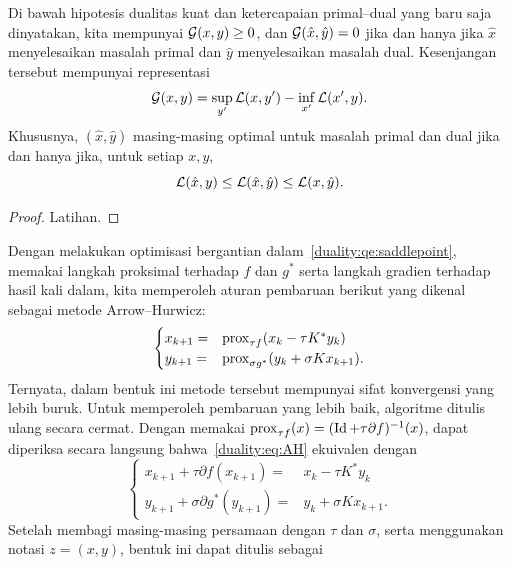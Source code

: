 \begin{lemma}
    Di bawah hipotesis dualitas kuat dan ketercapaian primal--dual yang baru saja dinyatakan, kita mempunyai $\mathcal{G}(x,y)\geq 0$, dan $\mathcal{G}(\hat x,\hat y) = 0$ jika dan hanya jika $\hat x$ menyelesaikan masalah primal dan $\hat y$ menyelesaikan masalah dual. Kesenjangan tersebut mempunyai representasi
    \begin{equation}
        \mathcal{G}(x,y) = \sup_{y'}\mathcal{L}(x,y') - \inf_{x'}\mathcal{L}(x',y).
    \end{equation}
    Khususnya, $(\hat x,\hat y)$ masing-masing optimal untuk masalah primal dan dual jika dan hanya jika, untuk setiap $x,y$,
    \begin{equation}
        \mathcal{L}(\hat x,y)\leq \mathcal{L}(\hat x,\hat y)\leq \mathcal{L}(x,\hat y).
    \end{equation}
\end{lemma}
\begin{proof}
    Latihan.
\end{proof}
Dengan melakukan optimisasi bergantian dalam~\eqref{duality:qe:saddlepoint}, memakai langkah proksimal terhadap $f$ dan $g^*$ serta langkah gradien terhadap hasil kali dalam, kita memperoleh aturan pembaruan berikut yang dikenal sebagai metode Arrow--Hurwicz:
\begin{equation}\label{duality:eq:AH}
    \begin{cases}
        x_{k+1} =& \mathrm{prox}_{\tau f}(x_k-\tau K^*y_k)\\
        y_{k+1} =& \mathrm{prox}_{\sigma g^*}(y_k+\sigma Kx_{k+1}).
    \end{cases}
\end{equation}
Ternyata, dalam bentuk ini metode tersebut mempunyai sifat konvergensi yang lebih buruk. Untuk memperoleh pembaruan yang lebih baik, algoritme ditulis ulang secara cermat. Dengan memakai $\mathrm{prox}_{\tau f}(x) = (\operatorname{\mathrm{Id}} + \tau \partial f)^{-1}(x)$, dapat diperiksa secara langsung bahwa~\eqref{duality:eq:AH} ekuivalen dengan
\begin{equation}
    \begin{cases}
        x_{k+1} +\tau \partial f(x_{k+1}) =& x_k - \tau K^*y_k\\
        y_{k+1} +\sigma \partial g^*(y_{k+1}) =& y_k + \sigma Kx_{k+1}.
    \end{cases}
\end{equation}
Setelah membagi masing-masing persamaan dengan $\tau$ dan $\sigma$, serta menggunakan notasi $z=(x,y)$, bentuk ini dapat ditulis sebagai
